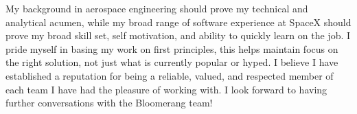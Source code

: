 \begin{cvletter}

My background in aerospace engineering should prove my technical and analytical acumen, while my
broad range of software experience at SpaceX should prove my broad skill set, self motivation, and
ability to quickly learn on the job. I pride myself in basing my work on first principles, this
helps maintain focus on the right solution, not just what is currently popular or hyped. I believe I
have established a reputation for being a reliable, valued, and respected member of each team I have
had the pleasure of working with. I look forward to having further conversations with the Bloomerang
team!


\end{cvletter}

